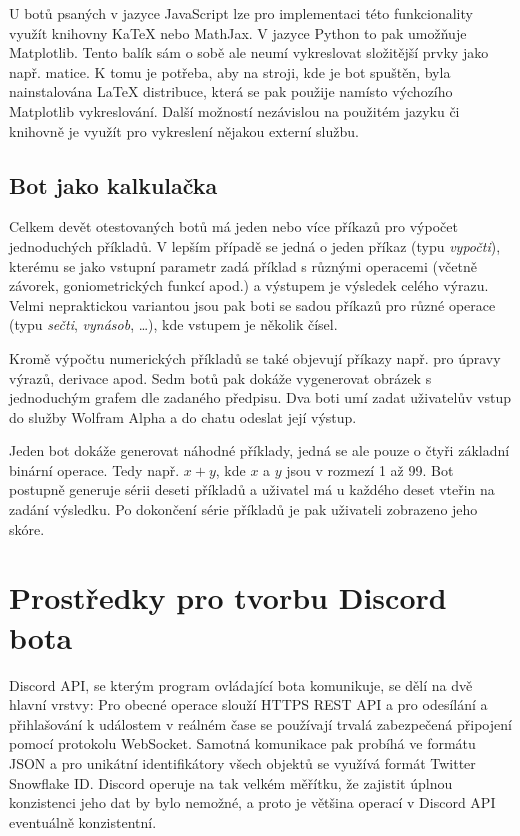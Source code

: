 \documentclass[FM]{tulthesis}
\begin{document}
	U botů psaných v jazyce JavaScript lze pro implementaci této funkcionality využít knihovny KaTeX nebo MathJax. V jazyce Python to pak umožňuje Matplotlib. Tento balík sám o sobě ale neumí vykreslovat složitější prvky jako např. matice. K tomu je potřeba, aby na stroji, kde je bot spuštěn, byla nainstalována LaTeX distribuce, která se pak použije namísto výchozího Matplotlib vykreslování. Další možností nezávislou na použitém jazyku či knihovně je využít pro vykreslení nějakou externí službu.
	
	\section{Bot jako kalkulačka}
	
	Celkem devět otestovaných botů má jeden nebo více příkazů pro výpočet jednoduchých příkladů. V lepším případě se jedná o jeden příkaz (typu \textit{vypočti}), kterému se jako vstupní parametr zadá příklad s různými operacemi (včetně závorek, goniometrických funkcí apod.) a výstupem je výsledek celého výrazu. Velmi nepraktickou variantou jsou pak boti se sadou příkazů pro různé operace (typu \textit{sečti}, \textit{vynásob}, \dots), kde vstupem je několik čísel.
	
	Kromě výpočtu numerických příkladů se také objevují příkazy např. pro úpravy výrazů, derivace apod. Sedm botů pak dokáže vygenerovat obrázek s jednoduchým grafem dle zadaného předpisu. Dva boti umí zadat uživatelův vstup do služby Wolfram Alpha a do chatu odeslat její výstup.
	
	Jeden bot dokáže generovat náhodné příklady, jedná se ale pouze o čtyři základní binární operace. Tedy např. $x+y$, kde $x$ a $y$ jsou v rozmezí 1 až 99. Bot postupně generuje sérii deseti příkladů a uživatel má u každého deset vteřin na zadání výsledku. Po dokončení série příkladů je pak uživateli zobrazeno jeho skóre.
	
	
	\chapter{Prostředky pro tvorbu Discord bota}
		
	Discord API, se kterým program ovládající bota komunikuje, se dělí na dvě hlavní vrstvy: Pro obecné operace slouží HTTPS REST API a pro odesílání a přihlašování k událostem v reálném čase se používají trvalá zabezpečená připojení pomocí protokolu WebSocket. Samotná komunikace pak probíhá ve formátu JSON a pro unikátní identifikátory všech objektů se využívá formát Twitter Snowflake ID.	Discord operuje na tak velkém měřítku, že zajistit úplnou konzistenci jeho dat by bylo nemožné, a proto je většina operací v Discord API eventuálně konzistentní. \cite{doc_Discord}
	
\end{document}
